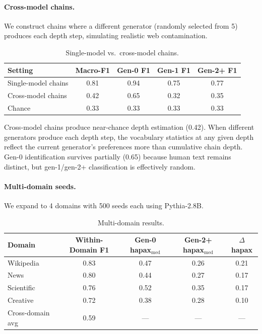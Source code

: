 \documentclass[letterpaper]{article}
\begin{document}
\paragraph{Cross-model chains.}
We construct chains where a different generator (randomly selected from 5) produces each depth step, simulating realistic web contamination.

\begin{table}[h]
\centering
\caption{Single-model vs.\ cross-model chains.}
\label{tab:crossmodel}
\begin{tabular}{lcccc}
\toprule
Setting & Macro-F1 & Gen-0 F1 & Gen-1 F1 & Gen-2+ F1 \\
\midrule
Single-model chains & 0.81 & 0.94 & 0.75 & 0.77 \\
Cross-model chains & 0.42 & 0.65 & 0.32 & 0.35 \\
Chance & 0.33 & 0.33 & 0.33 & 0.33 \\
\bottomrule
\end{tabular}
\end{table}

Cross-model chains produce near-chance depth estimation (0.42). When different generators produce each depth step, the vocabulary statistics at any given depth reflect the current generator's preferences more than cumulative chain depth. Gen-0 identification survives partially (0.65) because human text remains distinct, but gen-1/gen-2+ classification is effectively random.

\paragraph{Multi-domain seeds.}
We expand to 4 domains with 500 seeds each using Pythia-2.8B.

\begin{table}[h]
\centering
\caption{Multi-domain results.}
\label{tab:domain}
\begin{tabular}{lcccc}
\toprule
Domain & Within-Domain F1 & Gen-0 hapax$_\text{med}$ & Gen-2+ hapax$_\text{med}$ & $\Delta$hapax \\
\midrule
Wikipedia & 0.83 & 0.47 & 0.26 & 0.21 \\
News & 0.80 & 0.44 & 0.27 & 0.17 \\
Scientific & 0.76 & 0.52 & 0.35 & 0.17 \\
Creative & 0.72 & 0.38 & 0.28 & 0.10 \\
Cross-domain avg & 0.59 & --- & --- & --- \\
\bottomrule
\end{tabular}
\end{table}
\end{document}
